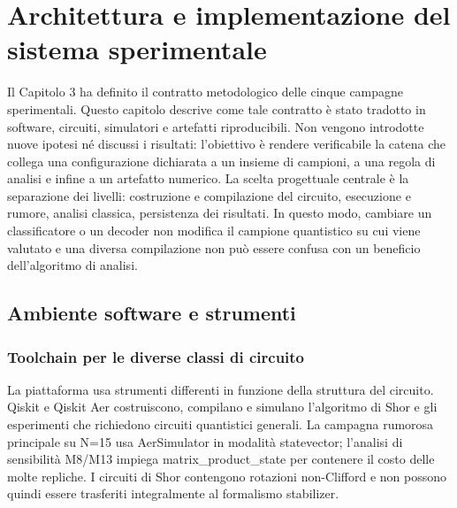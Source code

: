 \chapter{Architettura e implementazione del sistema sperimentale}
\label{chap:implementazione}
\label{chap:sviluppo}
\label{chap:strumenti}


Il Capitolo 3 ha definito il contratto metodologico delle cinque campagne sperimentali. Questo capitolo descrive come tale contratto è stato tradotto in software, circuiti, simulatori e artefatti riproducibili. Non vengono introdotte nuove ipotesi né discussi i risultati: l'obiettivo è rendere verificabile la catena che collega una configurazione dichiarata a un insieme di campioni, a una regola di analisi e infine a un artefatto numerico. La scelta progettuale centrale è la separazione dei livelli: costruzione e compilazione del circuito, esecuzione e rumore, analisi classica, persistenza dei risultati. In questo modo, cambiare un classificatore o un decoder non modifica il campione quantistico su cui viene valutato e una diversa compilazione non può essere confusa con un beneficio dell'algoritmo di analisi.

\section{Ambiente software e strumenti}\label{sec:finale_4_1}

\subsection{Toolchain per le diverse classi di circuito}\label{sec:finale_4_1_1}

La piattaforma usa strumenti differenti in funzione della struttura del circuito. Qiskit e Qiskit Aer \cite{qiskit2023} costruiscono, compilano e simulano l'algoritmo di Shor e gli esperimenti che richiedono circuiti quantistici generali. La campagna rumorosa principale su N=15 usa AerSimulator in modalità statevector; l'analisi di sensibilità M8/M13 impiega matrix\_product\_state per contenere il costo delle molte repliche. I circuiti di Shor contengono rotazioni non-Clifford e non possono quindi essere trasferiti integralmente al formalismo stabilizer.

